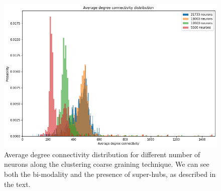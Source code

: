\begin{figure}
    \centering
    \includegraphics[width=\textwidth]{Images/Coarse/Avg_deg_con_distr.png}
    \caption{Average degree connectivity distribution for different number of neurons along
	the clustering coarse graining technique. We can see both the bi-modality and the presence of 
	super-hubs, as described in the text.}
    \label{fig:con_distr}
\end{figure}

